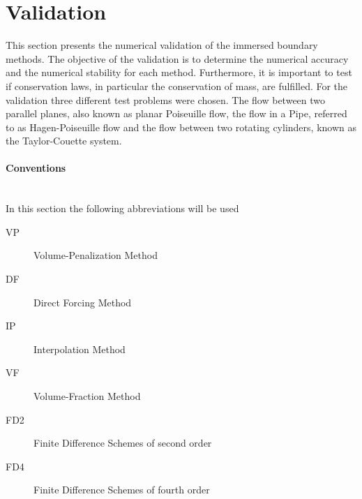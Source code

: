 \section{Validation}

This section presents the numerical validation of the immersed boundary methods.
The objective of the validation is to determine the numerical accuracy and
the numerical stability for each method.
Furthermore, it is important to test if conservation laws, in particular the conservation of mass,
are fulfilled.
For the validation three different test problems were chosen.
The flow between two parallel planes, also known as planar Poiseuille flow, the flow in a Pipe, referred to as Hagen-Poiseuille flow and the flow
between two rotating cylinders, known as the Taylor-Couette system.

\paragraph{Conventions}\mbox{}\\

In this section the following abbreviations will be used

\begin{multicols}{2}
\begin{description}
    \item[VP]{Volume-Penalization Method}
    \item[DF]{Direct Forcing Method}
    \item[IP]{Interpolation Method}
    \item[VF]{Volume-Fraction Method}
    \item[FD2]{Finite Difference Schemes of second order}
    \item[FD4]{Finite Difference Schemes of fourth order}
\end{description}
\end{multicols}


